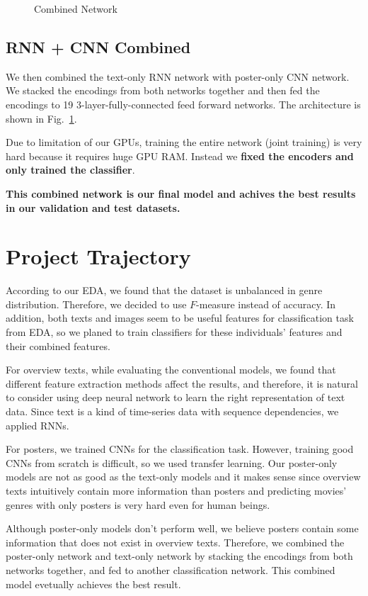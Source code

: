 \documentclass[12pt]{article} %
\begin{document}
\begin{figure}[H]
\begin{minipage}{0.31\textwidth}
  \caption{Combined Network}
  \label{fig:combined-nn}
\end{minipage}%
\end{figure}

\subsection{RNN + CNN Combined}

We then combined the text-only RNN network with poster-only CNN network. We stacked the encodings from both networks together and then fed the encodings to 19 3-layer-fully-connected feed forward networks. The architecture is shown in Fig.~\ref{fig:combined-nn}.

Due to limitation of our GPUs, training the entire network (joint training) is very hard because it requires huge GPU RAM. Instead we {\bf fixed the encoders and only trained the classifier}.

{\bf This combined network is our final model and achives the best results in our validation and test datasets.}

\section{Project Trajectory}

According to our EDA, we found that the dataset is unbalanced in genre distribution. Therefore, we decided to use $F$-measure instead of accuracy. In addition, both texts and images seem to be useful features for classification task from EDA, so we planed to train classifiers for these individuals' features and their combined features.

For overview texts, while evaluating the conventional models, we found that different feature extraction methods affect the results, and therefore, it is natural to consider using deep neural network to learn the right representation of text data. Since text is a kind of time-series data with sequence dependencies, we applied RNNs.

For posters, we trained CNNs for the classification task. However, training good CNNs from scratch is difficult, so we used transfer learning. Our poster-only models are not as good as the text-only models and it makes sense since overview texts intuitively contain more information than posters and predicting movies' genres with only posters is very hard even for human beings.

Although poster-only models don't perform well, we believe posters contain some information that does not exist in overview texts. Therefore, we combined the poster-only network and text-only network by stacking the encodings from both networks together, and fed to another classification network. This combined model evetually achieves the best result.
\end{document}
